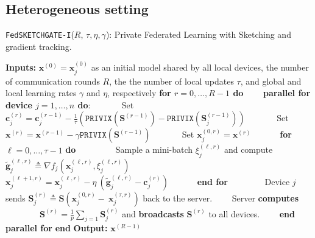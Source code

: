 




\subsection{Heterogeneous setting}

\begin{algorithm}[H]
\caption{\texttt{FedSKETCHGATE-I}($R$, $\tau, \eta, \gamma$): Private Federated Learning with Sketching and gradient tracking. }\label{Alg:PFLHet}
\begin{algorithmic}[1]
\State \textbf{Inputs:} $\boldsymbol{x}^{(0)}=\boldsymbol{x}^{(0)}_j$ as an initial  model shared by all local devices, the number of communication rounds $R$, the the number of local updates $\tau$, and global and local learning rates $\gamma$ and $\eta$, respectively
\State \textbf{for $r=0, \ldots, R-1$ do}
\State $\qquad$\textbf{parallel for device $j=1,\ldots,n$ do}:
\State $\qquad\quad$ Set $\mathbf{c}_j^{(r)}=\mathbf{c}_j^{(r-1)}-\frac{1}{\tau}\left({\texttt{PRIVIX}}\left(\mathbf{S}^{(r-1)}\right)-{\texttt{PRIVIX}}\left(\mathbf{S}^{(r-1)}_{j}\right)\right)$
\State $\qquad\quad$ Set $\boldsymbol{x}^{(r)}=\boldsymbol{x}^{(r-1)}-\gamma{\texttt{PRIVIX}}\left(\mathbf{S}^{(r-1)}\right)$
\State $\qquad\quad$ Set $\boldsymbol{x}_j^{(0,r)}=\boldsymbol{x}^{(r)}$ %
\State $\qquad\quad $\textbf{for} $\ell=0,\ldots,\tau-1$ \textbf{do}
\State $\qquad\quad\quad$ Sample a mini-batch $\xi_j^{(\ell,r)}$ and compute $\tilde{\mathbf{g}}_{j}^{(\ell,r)}\triangleq\nabla{f}_j(\boldsymbol{x}^{(\ell,r)}_j,\xi_j^{(\ell,r)})$
\State $\qquad\quad\quad$ $\boldsymbol{x}^{(\ell+1,r)}_{j}=\boldsymbol{x}^{(\ell,r)}_j-\eta~\left( \tilde{\mathbf{g}}_{j}^{(\ell,r)}-\mathbf{c}_j^{(r)}\right)$ \label{eq:update-rule-alg}
\State $\qquad\quad$\textbf{end for}
\State $\qquad\quad\quad$Device $j$ sends $\mathbf{S}^{(r)}_{j}\triangleq\mathbf{S}\left(\boldsymbol{x}_j^{(0,r)}-~{\boldsymbol{x}}_{j}^{(\tau,r)}\right)$ back to the server.
\State $\qquad$Server \textbf{computes} 
\State $\qquad\qquad {\mathbf{S}}^{(r)}=\frac{1}{p}\sum_{j=1}\mathbf{S}^{(r)}_{j}$ and  \textbf{broadcasts} ${\mathbf{S}}^{(r)}$ to all devices.
\State $\qquad$\textbf{end parallel for}
\State \textbf{end}
\State \textbf{Output:} ${\boldsymbol{x}}^{(R-1)}$
\vspace{- 0.1cm}
\end{algorithmic}
\end{algorithm}


